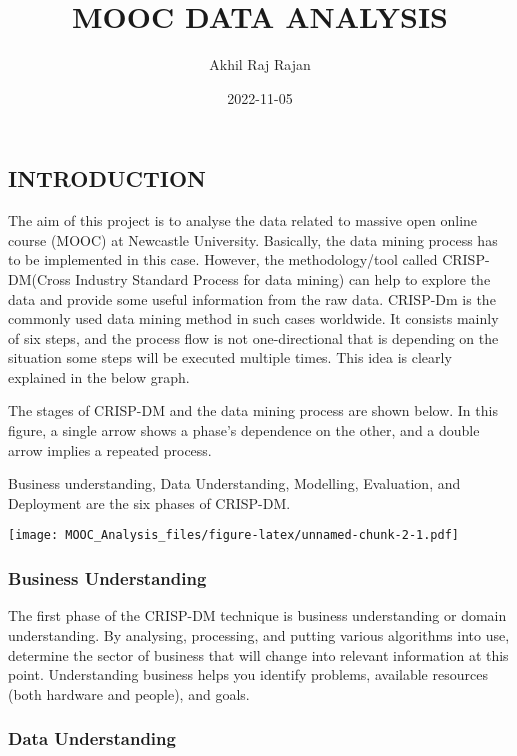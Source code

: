 \documentclass[
]{article}
\title{MOOC DATA ANALYSIS}
\author{Akhil Raj Rajan}
\date{2022-11-05}
\begin{document}
\maketitle

\hypertarget{introduction}{%
\subsection{INTRODUCTION}\label{introduction}}

The aim of this project is to analyse the data related to massive open
online course (MOOC) at Newcastle University. Basically, the data mining
process has to be implemented in this case. However, the
methodology/tool called CRISP-DM(Cross Industry Standard Process for
data mining) can help to explore the data and provide some useful
information from the raw data. CRISP-Dm is the commonly used data mining
method in such cases worldwide. It consists mainly of six steps, and the
process flow is not one-directional that is depending on the situation
some steps will be executed multiple times. This idea is clearly
explained in the below graph.

The stages of CRISP-DM and the data mining process are shown below. In
this figure, a single arrow shows a phase's dependence on the other, and
a double arrow implies a repeated process.

Business understanding, Data Understanding, Modelling, Evaluation, and
Deployment are the six phases of CRISP-DM.

\texttt{[image: MOOC\_Analysis\_files/figure-latex/unnamed-chunk-2-1.pdf]}

\hypertarget{business-understanding}{%
\subsubsection{\texorpdfstring{\textbf{Business
Understanding}}{Business Understanding}}\label{business-understanding}}

The first phase of the CRISP-DM technique is business understanding or
domain understanding. By analysing, processing, and putting various
algorithms into use, determine the sector of business that will change
into relevant information at this point. Understanding business helps
you identify problems, available resources (both hardware and people),
and goals.

\hypertarget{data-understanding}{%
\subsubsection{\texorpdfstring{\textbf{Data
Understanding}}{Data Understanding}}\label{data-understanding}}
\end{document}
